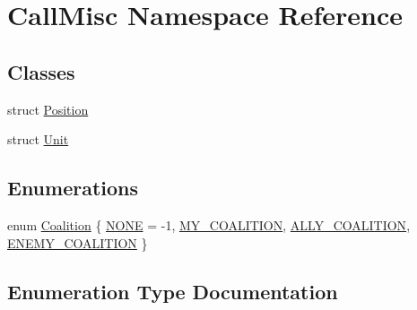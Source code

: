 \hypertarget{namespace_call_misc}{}\section{Call\+Misc Namespace Reference}
\label{namespace_call_misc}
\subsection*{Classes}
\begin{DoxyCompactItemize}
\item 
struct \hyperlink{struct_call_misc_1_1_position}{Position}
\item 
struct \hyperlink{struct_call_misc_1_1_unit}{Unit}
\end{DoxyCompactItemize}
\subsection*{Enumerations}
\begin{DoxyCompactItemize}
\item 
enum \hyperlink{namespace_call_misc_a490b3c2ef1a821675848ebcab0b677d8}{Coalition} \{ \hyperlink{namespace_call_misc_a490b3c2ef1a821675848ebcab0b677d8a55c17878e61b97e8ce25f6dc4c2da627}{N\+O\+NE} = -\/1, 
\hyperlink{namespace_call_misc_a490b3c2ef1a821675848ebcab0b677d8a38d26e9fc963014a8b85324685b853fc}{M\+Y\+\_\+\+C\+O\+A\+L\+I\+T\+I\+ON}, 
\hyperlink{namespace_call_misc_a490b3c2ef1a821675848ebcab0b677d8a6fc0ad3a442b6b9629c67957b12d1351}{A\+L\+L\+Y\+\_\+\+C\+O\+A\+L\+I\+T\+I\+ON}, 
\hyperlink{namespace_call_misc_a490b3c2ef1a821675848ebcab0b677d8a5b0cc8b822bdf2bab495983dcd24a4e4}{E\+N\+E\+M\+Y\+\_\+\+C\+O\+A\+L\+I\+T\+I\+ON}
 \}
\end{DoxyCompactItemize}


\subsection{Enumeration Type Documentation}
